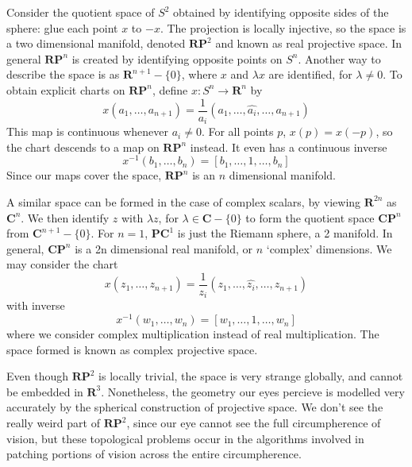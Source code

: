 \begin{example}
    Consider the quotient space of $S^2$ obtained by identifying opposite sides of the sphere: glue each point $x$ to $-x$. The projection is locally injective, so the space is a two dimensional manifold, denoted  $\mathbf{R} \mathbf{P}^2$ and known as real projective space. In general $\mathbf{R} \mathbf{P}^n$ is created by identifying opposite points on $S^n$. Another way to describe the space is as $\mathbf{R}^{n+1} - \{ 0 \}$, where $x$ and $\lambda x$ are identified, for $\lambda \neq 0$. To obtain explicit charts on $\mathbf{R} \mathbf{P}^n$, define $x: S^n \to \mathbf{R}^n$ by
    \[ x(a_1, \dots, a_{n+1}) = \frac{1}{a_i} (a_1, \dots, \widehat{a_i}, \dots, a_{n+1}) \]
    This map is continuous whenever $a_i \neq 0$. For all points $p$, $x(p) = x(-p)$, so the chart descends to a map on $\mathbf{R} \mathbf{P}^n$ instead. It even has a continuous inverse
    \[ x^{-1}(b_1, \dots, b_n) = \left[ b_1, \dots, 1, \dots, b_n \right] \]
    Since our maps cover the space, $\mathbf{R} \mathbf{P}^n$ is an $n$ dimensional manifold.
\end{example}

\begin{example}
    A similar space can be formed in the case of complex scalars, by viewing $\mathbf{R}^{2n}$ as $\mathbf{C}^n$. We then identify $z$ with $\lambda z$, for $\lambda \in \mathbf{C} - \{ 0 \}$ to form the quotient space $\mathbf{CP}^n$ from $\mathbf{C}^{n+1} - \{ 0 \}$. For $n = 1$, $\mathbf{P} \mathbf{C}^1$ is just the Riemann sphere, a 2 manifold. In general, $\mathbf{CP}^n$ is a 2n dimensional real manifold, or $n$ `complex' dimensions. We may consider the chart
    \[ x(z_1, \dots, z_{n+1}) = \frac{1}{z_i} (z_1, \dots, \widehat{z_i}, \dots, z_{n+1}) \]
    with inverse
    \[ x^{-1}(w_1, \dots, w_n) = [w_1, \dots, 1, \dots, w_n] \]
    where we consider complex multiplication instead of real multiplication. The space formed is known as complex projective space.
\end{example}

Even though $\mathbf{RP}^2$ is locally trivial, the space is very strange globally, and cannot be embedded in $\mathbf{R}^3$. Nonetheless, the geometry our eyes percieve is modelled very accurately by the spherical construction of projective space. We don't see the really weird part of $\mathbf{R} \mathbf{P}^2$, since our eye cannot see the full circumpherence of vision, but these topological problems occur in the algorithms involved in patching portions of vision across the entire circumpherence.

